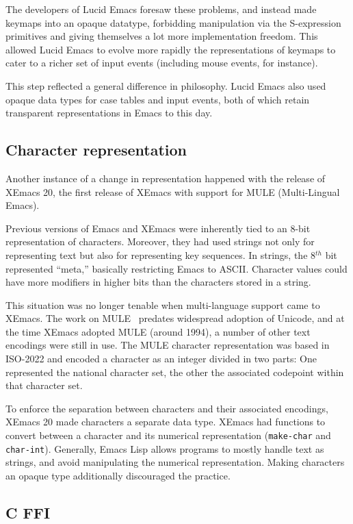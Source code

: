 \documentclass[format=acmsmall, review]{acmart}
\newcommand \Elisp {Emacs Lisp}
\begin{document}
The developers of Lucid Emacs foresaw these problems, and
instead made keymaps into an opaque datatype, forbidding manipulation via the
S-expression primitives and giving themselves a lot more implementation
freedom.  This allowed Lucid Emacs to evolve more rapidly the
representations of keymaps to cater to a richer set of input events
(including mouse events, for instance).

This step reflected a general difference in philosophy.  Lucid Emacs
also used opaque data types for case tables and input events, both of
which retain transparent representations in Emacs to this day.

\subsection{Character representation}
\label{sec:character-representation}

Another instance of a change in representation happened with the
release of XEmacs 20, the first release of XEmacs with support for
MULE (Multi-Lingual Emacs).

Previous versions of Emacs and XEmacs were inherently tied to an 8-bit
representation of characters.  Moreover, they had used strings not
only for representing text but also for representing key sequences.
In strings, the 8$^{th}$ bit represented ``meta,'' basically restricting
Emacs to ASCII.  Character values could have more
modifiers in higher bits than the characters stored in a string.

This situation was no longer tenable when multi-language support came
to XEmacs.  The work on MULE~\cite{Ohmaki2002} predates widespread
adoption of Unicode, and at the time XEmacs adopted MULE (around
1994), a number of other text encodings were still in use.  The MULE
character representation was based in ISO-2022 and encoded a character as an
integer divided in two parts: One represented the national character set,
the other the associated codepoint within that character set.

To enforce the separation between characters and their associated
encodings, XEmacs 20 made characters a separate data type.  XEmacs had
functions to convert between a character and its numerical
representation (\texttt{make-char} and \texttt{char-int}).  Generally,
\Elisp{} allows programs to mostly handle text as strings,
and avoid manipulating the numerical representation.  Making
characters an opaque type additionally discouraged the practice.

\subsection{C FFI}
\end{document}
